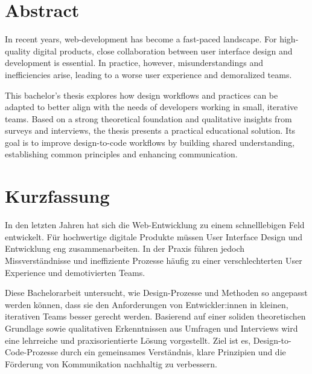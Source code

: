 \newpage
\section*{Abstract}
In recent years, web-development has become a fast-paced landscape. For high-quality digital
products, close collaboration between user interface design and development is essential. In
practice, however, misunderstandings and inefficiencies arise, leading to a worse user experience
and demoralized teams.

This bachelor's thesis explores how design workflows and practices can be adapted to better align
with the needs of developers working in small, iterative teams. Based on a strong theoretical
foundation and qualitative insights from surveys and interviews, the thesis presents a practical
educational solution. Its goal is to improve design-to-code workflows by building shared
understanding, establishing common principles and enhancing communication.

\section*{Kurzfassung}
In den letzten Jahren hat sich die Web-Entwicklung zu einem schnelllebigen Feld entwickelt. Für
hochwertige digitale Produkte müssen User Interface Design und Entwicklung eng zusammenarbeiten. In
der Praxis führen jedoch Missverständnisse und ineffiziente Prozesse häufig zu einer
verschlechterten User Experience und demotivierten Teams.

Diese Bachelorarbeit untersucht, wie Design-Prozesse und Methoden so angepasst werden können, dass
sie den Anforderungen von Entwickler:innen in kleinen, iterativen Teams besser gerecht werden.
Basierend auf einer soliden theoretischen Grundlage sowie qualitativen Erkenntnissen aus Umfragen
und Interviews wird eine lehrreiche und praxisorientierte Lösung vorgestellt. Ziel ist es,
Design-to-Code-Prozesse durch ein gemeinsames Verständnis, klare Prinzipien und die Förderung von
Kommunikation nachhaltig zu verbessern.

